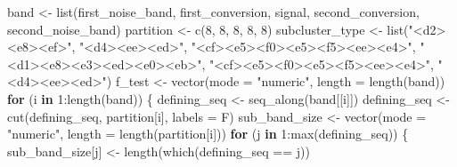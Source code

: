\documentclass[
]{article}
\newenvironment{Shaded}{\begin{snugshade}}{\end{snugshade}}
\newcommand{\AttributeTok}[1]{\textcolor[rgb]{0.77,0.63,0.00}{#1}}
\newcommand{\ControlFlowTok}[1]{\textcolor[rgb]{0.13,0.29,0.53}{\textbf{#1}}}
\newcommand{\DecValTok}[1]{\textcolor[rgb]{0.00,0.00,0.81}{#1}}
\newcommand{\FunctionTok}[1]{\textcolor[rgb]{0.00,0.00,0.00}{#1}}
\newcommand{\NormalTok}[1]{#1}
\newcommand{\OtherTok}[1]{\textcolor[rgb]{0.56,0.35,0.01}{#1}}
\newcommand{\SpecialCharTok}[1]{\textcolor[rgb]{0.00,0.00,0.00}{#1}}
\newcommand{\StringTok}[1]{\textcolor[rgb]{0.31,0.60,0.02}{#1}}
\begin{document}
\begin{Shaded}
\begin{Highlighting}[]
\NormalTok{band }\OtherTok{\textless{}{-}} \FunctionTok{list}\NormalTok{(first\_noise\_band, first\_conversion, signal, second\_conversion, second\_noise\_band)}
\NormalTok{partition }\OtherTok{\textless{}{-}} \FunctionTok{c}\NormalTok{(}\DecValTok{8}\NormalTok{, }\DecValTok{8}\NormalTok{, }\DecValTok{8}\NormalTok{, }\DecValTok{8}\NormalTok{, }\DecValTok{8}\NormalTok{)}
\NormalTok{subcluster\_type }\OtherTok{\textless{}{-}} \FunctionTok{list}\NormalTok{(}\StringTok{"\textless{}d2\textgreater{}\textless{}e8\textgreater{}\textless{}ef\textgreater{}"}\NormalTok{, }\StringTok{"\textless{}d4\textgreater{}\textless{}ee\textgreater{}\textless{}ed\textgreater{}"}\NormalTok{, }\StringTok{"\textless{}cf\textgreater{}\textless{}e5\textgreater{}\textless{}f0\textgreater{}\textless{}e5\textgreater{}\textless{}f5\textgreater{}\textless{}ee\textgreater{}\textless{}e4\textgreater{}"}\NormalTok{, }
    \StringTok{"\textless{}d1\textgreater{}\textless{}e8\textgreater{}\textless{}e3\textgreater{}\textless{}ed\textgreater{}\textless{}e0\textgreater{}\textless{}eb\textgreater{}"}\NormalTok{, }\StringTok{"\textless{}cf\textgreater{}\textless{}e5\textgreater{}\textless{}f0\textgreater{}\textless{}e5\textgreater{}\textless{}f5\textgreater{}\textless{}ee\textgreater{}\textless{}e4\textgreater{}"}\NormalTok{, }\StringTok{"\textless{}d4\textgreater{}\textless{}ee\textgreater{}\textless{}ed\textgreater{}"}\NormalTok{)}
\NormalTok{f\_test }\OtherTok{\textless{}{-}} \FunctionTok{vector}\NormalTok{(}\AttributeTok{mode =} \StringTok{"numeric"}\NormalTok{, }\AttributeTok{length =} \FunctionTok{length}\NormalTok{(band))}
\ControlFlowTok{for}\NormalTok{ (i }\ControlFlowTok{in} \DecValTok{1}\SpecialCharTok{:}\FunctionTok{length}\NormalTok{(band)) \{}
\NormalTok{    defining\_seq }\OtherTok{\textless{}{-}} \FunctionTok{seq\_along}\NormalTok{(band[[i]])}
\NormalTok{    defining\_seq }\OtherTok{\textless{}{-}} \FunctionTok{cut}\NormalTok{(defining\_seq, partition[i], }\AttributeTok{labels =}\NormalTok{ F)}
\NormalTok{    sub\_band\_size }\OtherTok{\textless{}{-}} \FunctionTok{vector}\NormalTok{(}\AttributeTok{mode =} \StringTok{"numeric"}\NormalTok{, }\AttributeTok{length =} \FunctionTok{length}\NormalTok{(partition[i]))}
    \ControlFlowTok{for}\NormalTok{ (j }\ControlFlowTok{in} \DecValTok{1}\SpecialCharTok{:}\FunctionTok{max}\NormalTok{(defining\_seq)) \{}
\NormalTok{        sub\_band\_size[j] }\OtherTok{\textless{}{-}} \FunctionTok{length}\NormalTok{(}\FunctionTok{which}\NormalTok{(defining\_seq }\SpecialCharTok{==}\NormalTok{ j))}

\end{Highlighting}
\end{Shaded}
\end{document}
